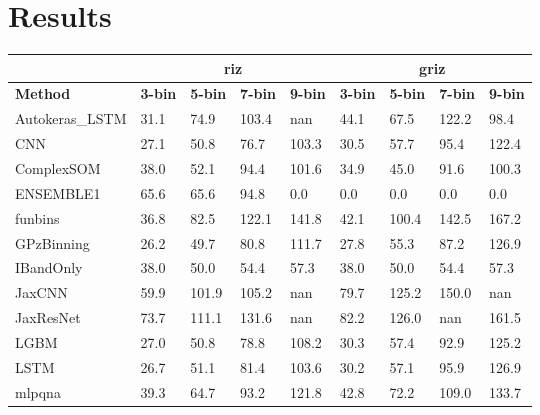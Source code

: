 \documentclass[twocolumn,twocolappendix]{aastex63}
\begin{document}
\section{Results}

\begin{table*}[]
\begin{tabular}{|l|llll|llll|}
                & \multicolumn{4}{c|}{\textbf{riz}}      & \multicolumn{4}{c|}{\textbf{griz}}                                \\ \hline
\textbf{Method} & \textbf{3-bin} & \textbf{5-bin} & \textbf{7-bin} & \textbf{9-bin} & \textbf{3-bin} & \textbf{5-bin} & \textbf{7-bin} & \textbf{9-bin} \\ \hline
{\sc Autokeras\_LSTM } & 31.1 & 74.9    & 103.4    & nan    & 44.1             & 67.5             & 122.2             & 98.4\\
{\sc CNN } & 27.1 & 50.8    & 76.7    & 103.3    & 30.5             & 57.7             & 95.4             & 122.4\\
{\sc ComplexSOM } & 38.0 & 52.1    & 94.4    & 101.6    & 34.9             & 45.0             & 91.6             & 100.3\\
{\sc ENSEMBLE1 } & 65.6 & 65.6    & 94.8    & 0.0    & 0.0             & 0.0             & 0.0             & 0.0\\
{\sc funbins } & 36.8 & 82.5    & 122.1    & 141.8    & 42.1             & 100.4             & 142.5             & 167.2\\
{\sc GPzBinning } & 26.2 & 49.7    & 80.8    & 111.7    & 27.8             & 55.3             & 87.2             & 126.9\\
{\sc IBandOnly } & 38.0 & 50.0    & 54.4    & 57.3    & 38.0             & 50.0             & 54.4             & 57.3\\
{\sc JaxCNN } & 59.9 & 101.9    & 105.2    & nan    & 79.7             & 125.2             & 150.0             & nan\\
{\sc JaxResNet } & 73.7 & 111.1    & 131.6    & nan    & 82.2             & 126.0             & nan             & 161.5\\
{\sc LGBM } & 27.0 & 50.8    & 78.8    & 108.2    & 30.3             & 57.4             & 92.9             & 125.2\\
{\sc LSTM } & 26.7 & 51.1    & 81.4    & 103.6    & 30.2             & 57.1             & 95.9             & 126.9\\
{\sc mlpqna } & 39.3 & 64.7    & 93.2    & 121.8    & 42.8             & 72.2             & 109.0             & 133.7\\

\end{tabular}
\end{table*}
\end{document}
